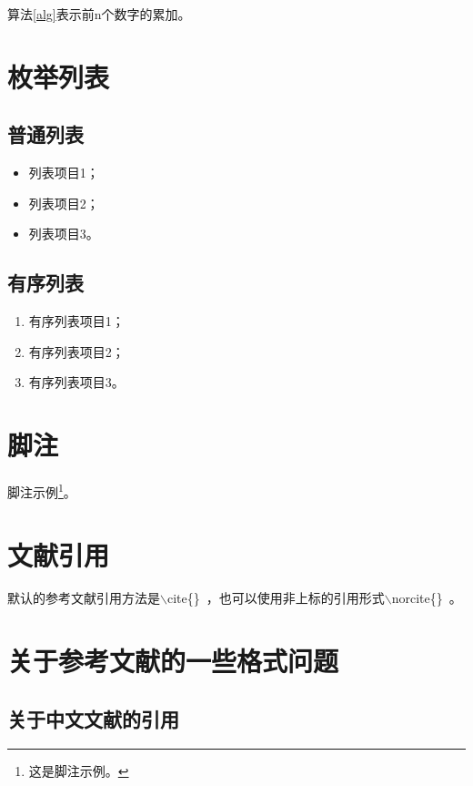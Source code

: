 算法\ref{alg}表示前n个数字的累加。


\section{枚举列表}

\subsection{普通列表}

\begin{itemize}
    \item 列表项目1；
    \item 列表项目2；
    \item 列表项目3。
\end{itemize}

\subsection{有序列表}

\begin{enumerate}
    \item 有序列表项目1；
    \item 有序列表项目2；
    \item 有序列表项目3。
\end{enumerate}


\section{脚注}

脚注示例\footnote{这是脚注示例。}。


\section{文献引用}

默认的参考文献引用方法是$\backslash$cite\{\}~\cite{broder1997resemblance,broder1997syntactic}，也可以使用非上标的引用形式$\backslash$norcite\{\}~。


\section{关于参考文献的一些格式问题}

\subsection{关于中文文献的引用}

